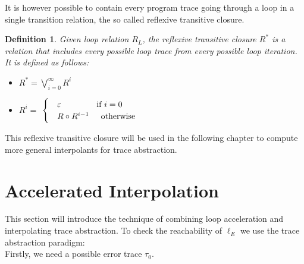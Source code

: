 \documentclass{article}
\newtheorem{mydef}{Definition}
\begin{document}
It is however possible to contain every program trace going through a loop in a single transition relation, the so called reflexive transitive closure.
\begin{mydef}
	Given loop relation $R_L$, the reflexive transitive closure $R^*$ is a relation that includes every possible loop trace from every possible loop iteration. It is defined as follows:
	\begin{itemize}
		\item $R^* = \bigvee_{i=0}^\infty R^i$
		\item $R^i = $
		$\begin{cases}
			& \varepsilon \hspace{1.5cm} \text{if}\ i = 0 \\
			& R \circ R^{i - 1} \hspace{0.5cm}\text{otherwise}
		\end{cases}$
	\end{itemize}
\end{mydef}
This reflexive transitive closure will be used in the following chapter to compute more general interpolants for trace abstraction.

\section{Accelerated Interpolation}
This section will introduce the technique of combining loop acceleration and interpolating trace abstraction. 
To check the reachability of $\ell_E$ we use the trace abstraction paradigm: \\
Firstly, we need a possible error trace $\tau_0$. \\ \\

\begin{figure}[H]
\end{figure}
\end{document}
